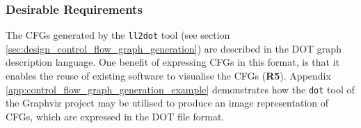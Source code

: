 
\subsubsection{Desirable Requirements}
\label{sec:eval_llvm_ir_library_desirable_requirements}


The CFGs generated by the \texttt{ll2dot} tool (see section \ref{sec:design_control_flow_graph_generation}) are described in the DOT graph description language. One benefit of expressing CFGs in this format, is that it enables the reuse of existing software to visualise the CFGs (\textbf{R5}). Appendix \ref{app:control_flow_graph_generation_example} demonstrates how the \texttt{dot} tool of the Graphviz project may be utilised to produce an image representation of CFGs, which are expressed in the DOT file format.
